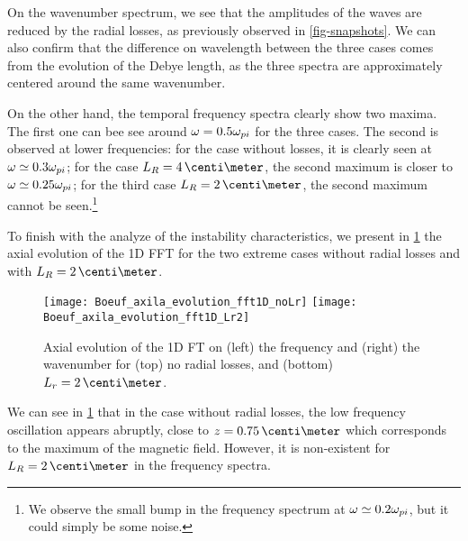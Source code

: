 On the wavenumber spectrum, we see that the amplitudes of the waves are reduced by the radial losses, as previously observed in \cref{fig-snapshots}.
We can also confirm that the difference on wavelength between the three cases comes from the evolution of the Debye length, as the three spectra are approximately centered around the same wavenumber.

On the other hand, the temporal frequency spectra clearly show two maxima. 
The first one can bee see around $\omega = 0.5 \omega_{pi}$ for the three cases.
The second is observed at lower frequencies\string: for the case without losses, it is clearly seen at  $\omega \simeq 0.3 \omega_{pi}$; for the case $L_R=4\,\centi\meter$, the second maximum is closer to $\omega \simeq 0.25 \omega_{pi}$; for the third case $L_R=2\,\centi\meter$, the second maximum cannot be seen.\footnote{We observe the small bump in the frequency spectrum at $\omega \simeq 0.2 \omega_{pi}$, but it could simply be some noise. }


To finish with the analyze of the instability characteristics, we present in \cref{fig-axial_fft1D} the axial evolution of the \ac{1D} \ac{FFT} for the two extreme cases without radial losses and with $L_R=2\,\centi\meter$.
 
\begin{figure}[!hbt]
  \centering
  \texttt{[image: Boeuf\_axila\_evolution\_fft1D\_noLr]}
  \texttt{[image: Boeuf\_axila\_evolution\_fft1D\_Lr2]}
  \caption{Axial evolution of the \ac{1D} \ac{FT} on (left) the frequency and (right) the wavenumber for (top) no radial losses, and (bottom) $L_r=2\,\centi\meter$. }
  \label{fig-axial_fft1D}
\end{figure}

We can see in \cref{fig-axial_fft1D} that in the case without radial losses, the low frequency oscillation appears abruptly, close to $z=0.75\,\centi\meter$ which corresponds to the maximum of the magnetic field.
However, it is non-existent for $L_R=2\,\centi\meter$ in the frequency spectra.


